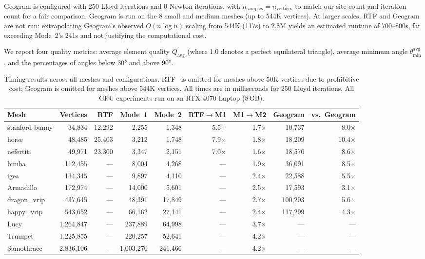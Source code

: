 Geogram is configured with 250 Lloyd iterations and 0 Newton iterations, with $n_{\mathrm{samples}} = n_{\mathrm{vertices}}$ to match our site count and iteration count for a fair comparison. Geogram is run on the 8 small and medium meshes (up to 544K vertices). At larger scales, RTF and Geogram are not run: extrapolating Geogram's observed $O(n \log n)$ scaling from 544K (117s) to 2.8M yields an estimated runtime of 700--800s, far exceeding Mode~2's 241s and not justifying the computational cost.

We report four quality metrics: average element quality $Q_{\mathrm{avg}}$ (where 1.0 denotes a perfect equilateral triangle), average minimum angle $\theta_{\min}^{\mathrm{avg}}$, and the percentages of angles below $30°$ and above $90°$.

\begin{table}[t]
\centering
\caption{Timing results across all meshes and configurations. RTF~\cite{yao2023rtf} is omitted for meshes above 50K vertices due to prohibitive cost; Geogram is omitted for meshes above 544K vertices. All times are in milliseconds for 250 Lloyd iterations. All GPU experiments run on an RTX 4070 Laptop (8\,GB).}
\label{tab:timing}
\small
\begin{tabular}{lrrrrrrrr}
\hline
Mesh & Vertices & RTF & Mode~1 & Mode~2 & RTF$\to$M1 & M1$\to$M2 & Geogram & vs.\ Geogram \\
\hline
stanford-bunny & 34{,}834   & 12{,}292 & 2{,}255   & 1{,}348   & 5.5$\times$ & 1.7$\times$ & 10{,}737   & 8.0$\times$ \\
horse          & 48{,}485   & 25{,}403 & 3{,}212   & 1{,}748   & 7.9$\times$ & 1.8$\times$ & 18{,}209   & 10.4$\times$ \\
nefertiti      & 49{,}971   & 23{,}300 & 3{,}347   & 2{,}151   & 7.0$\times$ & 1.6$\times$ & 18{,}570   & 8.6$\times$ \\
bimba          & 112{,}455  & ---      & 8{,}004   & 4{,}268   & ---         & 1.9$\times$ & 36{,}091   & 8.5$\times$ \\
igea           & 134{,}345  & ---      & 9{,}897   & 4{,}110   & ---         & 2.4$\times$ & 22{,}588   & 5.5$\times$ \\
Armadillo      & 172{,}974  & ---      & 14{,}000  & 5{,}601   & ---         & 2.5$\times$ & 17{,}593   & 3.1$\times$ \\
dragon\_vrip   & 437{,}645  & ---      & 48{,}391  & 17{,}849  & ---         & 2.7$\times$ & 100{,}203  & 5.6$\times$ \\
happy\_vrip    & 543{,}652  & ---      & 66{,}162  & 27{,}141  & ---         & 2.4$\times$ & 117{,}299  & 4.3$\times$ \\
Lucy           & 1{,}264{,}847 & ---   & 237{,}889 & 64{,}998  & ---         & 3.7$\times$ & ---        & --- \\
Trumpet        & 1{,}225{,}855 & ---   & 220{,}257 & 52{,}641  & ---         & 4.2$\times$ & ---        & --- \\
Samothrace     & 2{,}836{,}106 & ---   & 1{,}003{,}270 & 241{,}466 & ---     & 4.2$\times$ & ---        & --- \\
\hline
\end{tabular}
\end{table}

